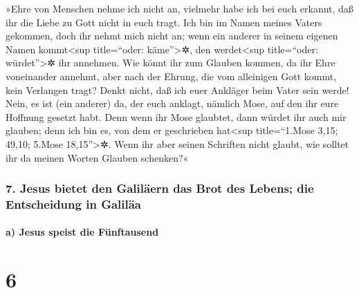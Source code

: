  »Ehre von Menschen nehme ich nicht an, 
vielmehr habe ich bei euch erkannt, daß ihr die Liebe zu Gott nicht in
euch tragt.  Ich bin im Namen meines Vaters gekommen,
doch ihr nehmt mich nicht an; wenn ein anderer in seinem eigenen Namen
kommt\textless sup title=``oder: käme''\textgreater✲, den
werdet\textless sup title=``oder: würdet''\textgreater✲ ihr annehmen.
 Wie könnt ihr zum Glauben kommen, da ihr Ehre
voneinander annehmt, aber nach der Ehrung, die vom alleinigen Gott
kommt, kein Verlangen tragt?  Denkt nicht, daß ich euer
Ankläger beim Vater sein werde! Nein, es ist (ein anderer) da, der euch
anklagt, nämlich Mose, auf den ihr eure Hoffnung gesetzt habt.
 Denn wenn ihr Mose glaubtet, dann würdet ihr auch mir
glauben; denn ich bin es, von dem er geschrieben hat\textless sup
title=``1.Mose 3,15; 49,10; 5.Mose 18,15''\textgreater✲. 
Wenn ihr aber seinen Schriften nicht glaubt, wie solltet ihr da meinen
Worten Glauben schenken?«

\hypertarget{jesus-bietet-den-galiluxe4ern-das-brot-des-lebens-die-entscheidung-in-galiluxe4a}{%
\subsubsection{7. Jesus bietet den Galiläern das Brot des Lebens; die
Entscheidung in
Galiläa}\label{jesus-bietet-den-galiluxe4ern-das-brot-des-lebens-die-entscheidung-in-galiluxe4a}}

\hypertarget{a-jesus-speist-die-fuxfcnftausend}{%
\paragraph{a) Jesus speist die
Fünftausend}\label{a-jesus-speist-die-fuxfcnftausend}}

\hypertarget{section-5}{%
\section{6}\label{section-5}}

